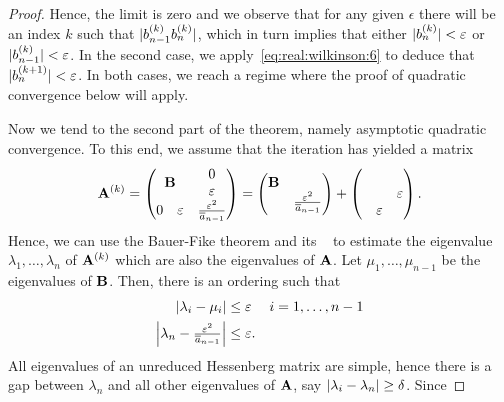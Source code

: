 \begin{proof}
Hence, the limit is zero and we observe that for any given $\epsilon$
there will be an index $k$ such that $\abs{b_{n-1}^{(k)}b_{n}^{(k)}}$,
which in turn implies that either $\abs{b_{n}^{(k)}}<\epsilon$ or
$\abs{b_{n-1}^{(k)}}<\epsilon$. In the second case, we
apply~\eqref{eq:real:wilkinson:6} to deduce that
$\abs{b_{n}^{(k+1)}}<\epsilon$. In both cases, we reach a regime where
the proof of quadratic convergence below will apply.

Now we tend to the second part of the theorem, namely asymptotic
quadratic convergence. To this end, we assume that the iteration has yielded a matrix
\begin{gather}
  \mata^{(k)} =
  \begin{pmatrix}
    \matb &
    \begin{matrix}
      0\\ \epsilon
    \end{matrix}
    \\
    \begin{matrix}
      0 & \epsilon
    \end{matrix}
    & \frac{\epsilon^2}{\overline a_{n-1}}
  \end{pmatrix}
  =
  \begin{pmatrix}
    \matb&\\&\frac{\epsilon^2}{\overline a_{n-1}}
  \end{pmatrix}
  +
  \begin{pmatrix}
    \\
    &&\epsilon\\
    &\epsilon
  \end{pmatrix}
  .
\end{gather}
Hence, we can use the Bauer-Fike theorem and its
~ to estimate the
eigenvalue $\lambda_1,\dots,\lambda_n$ of $\mata^{(k)}$ which are also
the eigenvalues of $\mata$. Let $\mu_1,\dots,\mu_{n-1}$ be the
eigenvalues of $\matb$. Then, there is an ordering such that
\begin{gather}
  \begin{aligned}
  \abs*{\lambda_i-\mu_i} & \le \epsilon & i&=1,\dots,n-1\\
  \abs*{\lambda_n - \tfrac{\epsilon^2}{\overline a_{n-1}}} &\le\epsilon.
  \end{aligned}
\end{gather}
All eigenvalues of an unreduced Hessenberg matrix are simple, hence
there is a gap between $\lambda_n$ and all other eigenvalues of
$\mata$, say $\abs{\lambda_i-\lambda_n}\ge \delta$.  Since

\end{proof}
